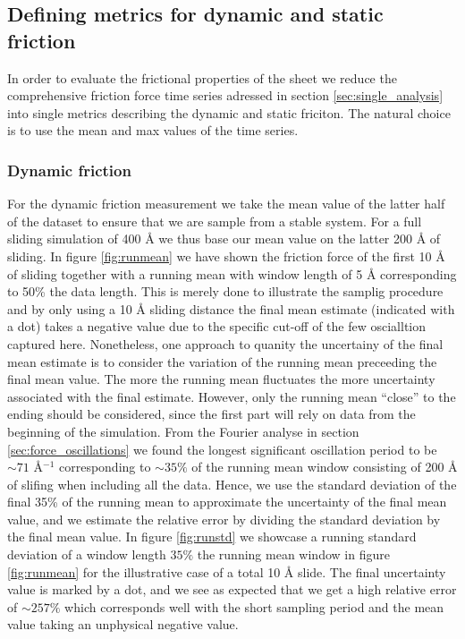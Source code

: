\subsection{Defining metrics for dynamic and static friction}\label{sec:def_dyn_and_stat}

In order to evaluate the frictional properties of the sheet we reduce the comprehensive friction force time series adressed in section \ref{sec:single_analysis} into single metrics describing the dynamic and static friciton. The natural choice is to use the mean and max values of the time series. 

\subsubsection{Dynamic friction} 
For the dynamic friction measurement we take the mean value of the latter half
of the dataset to ensure that we are sample from a stable system. For a full
sliding simulation of 400 Å we thus base our mean value on the latter 200 Å of
sliding. In figure \ref{fig:runmean} we have shown the friction force of the
first 10 Å of sliding together with a running mean with window length of 5 Å
corresponding to 50\% the data length. This is merely done to illustrate the
samplig procedure and by only using a 10 Å sliding distance the final mean
estimate (indicated with a dot) takes a negative value due to the specific cut-off of the
few oscialltion captured here. Nonetheless, one approach to quanity the
uncertainy of the final mean estimate is to consider the variation of the
running mean preceeding the final mean value. The more the running mean
fluctuates the more uncertainty associated with the final estimate. However, only the
running mean ``close'' to the ending should be considered, since the first part
will rely on data from the beginning of the simulation. From the Fourier analyse
in section \ref{sec:force_oscillations} we found the longest significant
oscillation period to be $\sim 71$ Å$^{-1}$ corresponding to $\sim 35 \%$ of the
running mean window consisting of 200 Å of slifing when including all the data.  Hence, we use the standard deviation of the final 35\% of the running mean to approximate the
uncertainty of the final mean value, and we estimate the relative error by
dividing the standard deviation by the final mean value. In figure \ref{fig:runstd} we showcase a running standard deviation of a window length $35 \%$ the running mean window in figure \ref{fig:runmean} for the illustrative case of a total 10 Å slide. The final uncertainty value is marked by a dot, and we see as expected that we get a high relative error of $\sim 257\%$ which corresponds well with the short sampling period and the mean value taking an unphysical negative value. 


